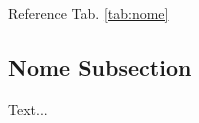     \noindent
    Reference Tab. \ref{tab:nome}
    
    \newpage

	\subsection{Nome Subsection}\label{subsection:nome_subsection}
	
	    Text...
	
	\newpage
